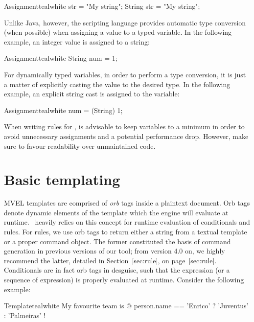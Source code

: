 \begin{codebox}{Assignment}{teal}{\icnote}{white}
str = "My string";
String str = "My string";
\end{codebox}

Unlike Java, however, the scripting language provides automatic type conversion (when possible) when assigning a value to a typed variable. In the following example, an integer value is assigned to a string:

\begin{codebox}{Assignment}{teal}{\icnote}{white}
String num = 1;
\end{codebox}

For dynamically typed variables, in order to perform a type conversion, it is just a matter of explicitly casting the value to the desired type. In the following example, an explicit string cast is assigned to the  variable:

\begin{codebox}{Assignment}{teal}{\icnote}{white}
num = (String) 1;
\end{codebox}

When writing rules for \arara, is advisable to keep variables to a minimum in order to avoid unnecessary assignments and a potential performance drop. However, make sure to favour readability over unmaintained code.

\section{Basic templating}
\label{sec:mvelbasictemplating}

MVEL templates are comprised of \emph{orb} tags inside a plaintext document. Orb tags denote dynamic elements of the template which the engine will evaluate at runtime. \arara\ heavily relies on this concept for runtime evaluation of conditionals and rules. For rules, we use orb tags to return either a string from a textual template or a proper command object. The former constituted the basis of command generation in previous versions of our tool; from version 4.0 on, we highly recommend the latter, detailed in Section~\ref{sec:rule}, on page~\ref{sec:rule}. Conditionals are in fact orb tags in desguise, such that the expression (or a sequence of expression) is properly evaluated at runtime. Consider the following example:

\begin{codebox}{Template}{teal}{\icnote}{white}
My favourite team is @{ person.name == 'Enrico'
? 'Juventus' : 'Palmeiras' }!
\end{codebox}

